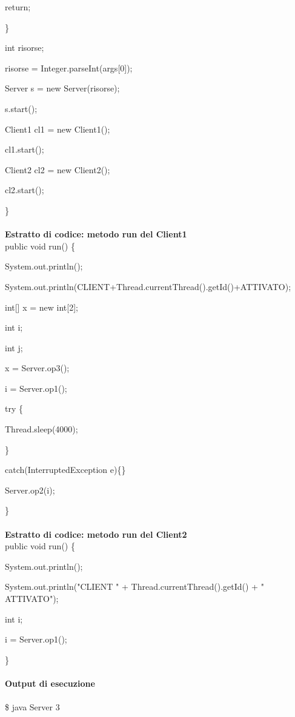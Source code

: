 \documentclass[10pt, a4paper]{article}
\begin{document}
            return;

        \}

        int risorse;

        risorse = Integer.parseInt(args[0]);

        Server s = new Server(risorse);

        s.start();

	Client1 cl1 = new Client1();

	cl1.start();

	Client2 cl2 = new Client2();

	cl2.start();

\}
\\\\
\textbf{Estratto di codice: metodo run del Client1}
\\

public void run() \{

		System.out.println();

        	System.out.println(CLIENT+Thread.currentThread().getId()+ATTIVATO);

		int[] x = new int[2];

		int i;

		int j;

		x = Server.op3();

		i = Server.op1();

		try \{ 

			Thread.sleep(4000);

		\} 

		catch(InterruptedException e)\{\}

		Server.op2(i);		

\}
\\\\
\textbf{Estratto di codice: metodo run del Client2}
\\

public void run() \{

		System.out.println();

        	System.out.println("CLIENT " + Thread.currentThread().getId() + " ATTIVATO");

		int i;

		i = Server.op1();

\}
\\\\
\textbf{Output di esecuzione}
\\\\
\$ java Server 3
\\
\end{document}
